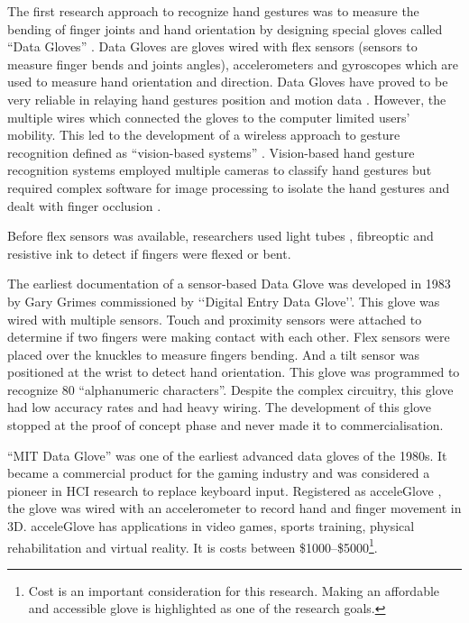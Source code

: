 The first research approach to recognize hand gestures was to measure the bending of finger joints and hand orientation by designing special gloves called ``Data Gloves'' \parencite{Rautaray2015}  \parencite{Pavlovic1997}  \parencite{Takahashi1992}  \parencite{Liang1998}. Data Gloves are gloves wired with flex sensors (sensors to measure finger bends and joints angles), accelerometers and gyroscopes which are used to measure hand orientation and direction. Data Gloves have proved to be very reliable in relaying hand gestures position and motion data \parencite{Mitra2007}. However, the multiple wires which connected the gloves to the computer limited users' mobility. This led to the development of a wireless approach to gesture recognition defined as ``vision-based systems'' \parencite{Rautaray2015}  \parencite{Pavlovic1997}. Vision-based hand gesture recognition systems employed multiple cameras to classify hand gestures but required complex software for image processing to isolate the hand gestures and dealt with finger occlusion \parencite{Shen2012}. 

Before flex sensors was available, researchers used light tubes \parencite{DipietroL.SabatiniA.M.Dario2008}, fibreoptic \parencite{DipietroL.SabatiniA.M.Dario2008} and resistive ink \parencite{LaViola1999} to detect if fingers were flexed or bent. 

The earliest documentation of a sensor-based Data Glove was developed in 1983 by Gary Grimes \parencite{DipietroL.SabatiniA.M.Dario2008} commissioned by ‘‘Digital Entry Data Glove’'. This glove was wired with multiple sensors. Touch and proximity sensors were attached to determine if two fingers were making contact with each other. Flex sensors were placed over the knuckles to measure fingers bending. And a tilt sensor was positioned at the wrist to detect hand orientation. This glove was programmed to recognize 80 ``alphanumeric characters''. Despite the complex circuitry, this glove had low accuracy rates and had heavy wiring. The development of this glove stopped at the proof of concept phase and never made it to commercialisation.

``MIT Data Glove'' \parencite{Premaratne2010} was one of the earliest advanced data gloves of the 1980s. It became a commercial product for the gaming industry and was considered a pioneer in HCI research to replace keyboard input. Registered as acceleGlove  \parencite{AcceleGlove2016} \parencite{AcceleGlove2017}, the glove was wired with an accelerometer to record hand and finger movement in 3D. acceleGlove has applications in video games, sports training, physical rehabilitation and virtual reality. It is costs between \$1000–\$5000\footnote{Cost is an important consideration for this research. Making an affordable and accessible glove is highlighted as one of the research goals.}.

